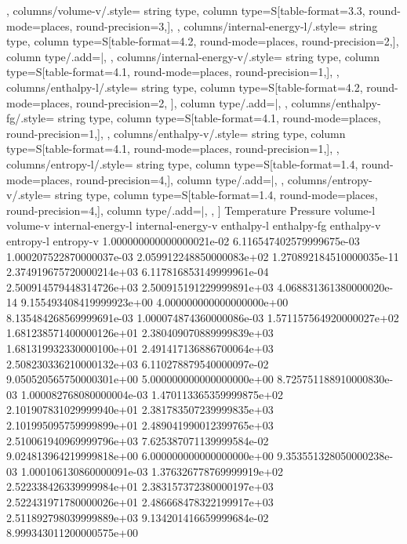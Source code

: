 \documentclass{article}
\begin{document}
\begin{center}
{        },
        columns/volume-v/.style={
            string type,
            column type={S[table-format=3.3, round-mode=places, round-precision=3,]},
        },
        columns/internal-energy-l/.style={
            string type,
            column type={S[table-format=4.2, round-mode=places, round-precision=2,]},
            column type/.add={|}{},
        },
        columns/internal-energy-v/.style={
            string type,
            column type={S[table-format=4.1, round-mode=places, round-precision=1,]},
        },
        columns/enthalpy-l/.style={
            string type,
            column type={S[table-format=4.2, round-mode=places, round-precision=2, ]},
            column type/.add={|}{},
        },
        columns/enthalpy-fg/.style={
            string type,
            column type={S[table-format=4.1, round-mode=places, round-precision=1,]},
        },
        columns/enthalpy-v/.style={
            string type,
            column type={S[table-format=4.1, round-mode=places, round-precision=1,]},
        },
        columns/entropy-l/.style={
            string type,
            column type={S[table-format=1.4, round-mode=places, round-precision=4,]},
            column type/.add={|}{},
        },
        columns/entropy-v/.style={
            string type,
            column type={S[table-format=1.4, round-mode=places, round-precision=4,]},
            column type/.add={}{|},
        },
    ]
    {
Temperature  Pressure  volume-l  volume-v internal-energy-l internal-energy-v enthalpy-l enthalpy-fg enthalpy-v entropy-l entropy-v
1.000000000000000021e-02 6.116547402579999675e-03 1.000207522870000037e-03 2.059912248850000083e+02 1.270892184510000035e-11 2.374919675720000214e+03 6.117816853149999961e-04 2.500914579448314726e+03 2.500915191229999891e+03 4.068831361380000020e-14 9.155493408419999923e+00
4.000000000000000000e+00 8.135484268569999691e-03 1.000074874360000086e-03 1.571157564920000027e+02 1.681238571400000126e+01 2.380409070889999839e+03 1.681319932330000100e+01 2.491417136886700064e+03 2.508230336210000132e+03 6.110278879540000097e-02 9.050520565750000301e+00
5.000000000000000000e+00 8.725751188910000830e-03 1.000082768080000004e-03 1.470113365359999875e+02 2.101907831029999940e+01 2.381783507239999835e+03 2.101995095759999899e+01 2.489041990012399765e+03 2.510061940969999796e+03 7.625387071139999584e-02 9.024813964219999818e+00
6.000000000000000000e+00 9.353551328050000238e-03 1.000106130860000091e-03 1.376326778769999919e+02 2.522338426339999984e+01 2.383157372380000197e+03 2.522431971780000026e+01 2.486668478322199917e+03 2.511892798039999889e+03 9.134201416659999684e-02 8.999343011200000575e+00
}
\end{center}
\end{document}
